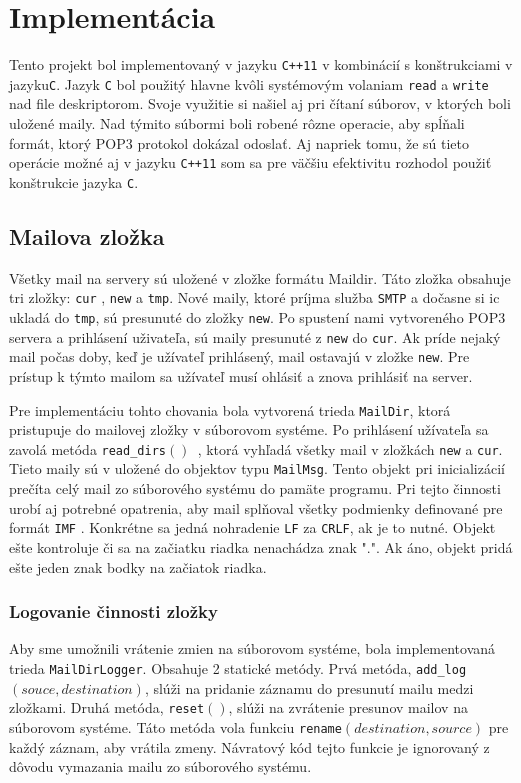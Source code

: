 \documentclass[a4paper, 11pt]{article}
\begin{document}
\section{Implementácia}
Tento projekt bol implementovaný v jazyku {\tt C++11} v kombinácií s konštrukciami v jazyku{\tt C}. Jazyk {\tt C} bol použitý hlavne kvôli systémovým volaniam {\tt read} a {\tt write} nad file deskriptorom. Svoje využitie si našiel aj pri čítaní súborov, v ktorých boli uložené maily. Nad týmito súbormi boli robené rôzne operacie, aby spĺňali formát, ktorý POP3 protokol dokázal odoslať. Aj napriek tomu, že sú tieto operácie možné aj v jazyku {\tt C++11} som sa pre väčšiu efektivitu rozhodol použiť konštrukcie jazyka {\tt C}.

	\subsection{Mailova zložka}
	Všetky mail na servery sú uložené v zložke formátu Maildir. Táto zložka obsahuje tri zložky: {\tt cur} , {\tt new} a {\tt tmp}. Nové maily, ktoré príjma služba {\tt SMTP} a dočasne si ic ukladá do {\tt tmp}, sú presunuté do zložky {\tt new}. Po spustení nami vytvoreného POP3 servera a prihlásení uživateľa, sú maily presunuté z {\tt new} do {\tt cur}. Ak príde nejaký mail počas doby, keď je užívateľ prihlásený, mail ostavajú v zložke {\tt new}. Pre prístup k týmto mailom sa užívateľ musí ohlásiť a znova prihlásiť na server.
	
	Pre implementáciu tohto chovania bola vytvorená trieda {\tt MailDir}, ktorá pristupuje do mailovej zložky v súborovom systéme. Po prihlásení užívateľa sa zavolá metóda {\tt read\_dirs$()$ }, ktorá vyhľadá všetky mail v zložkách {\tt new} a {\tt cur}. Tieto maily sú v uložené do objektov typu {\tt MailMsg}. Tento objekt pri inicializácií prečíta celý mail zo súborového systému do pamäte programu. Pri tejto činnosti urobí aj potrebné opatrenia, aby mail splňoval všetky podmienky definované pre formát {\tt IMF} . Konkrétne sa jedná nohradenie {\tt LF} za {\tt CRLF}, ak je to nutné. Objekt ešte kontroluje či sa na začiatku riadka nenachádza znak ".". Ak áno, objekt pridá ešte jeden znak bodky na začiatok riadka.
	
		\subsubsection{Logovanie činnosti zložky}
		Aby sme umožnili vrátenie zmien na súborovom systéme, bola implementovaná trieda {\tt MailDirLogger}. Obsahuje 2 statické metódy. Prvá metóda, {\tt add\_log$(souce, destination)$}, slúži na pridanie záznamu do presunutí mailu medzi zložkami. Druhá metóda, {\tt reset$()$}, slúži na zvrátenie presunov mailov na súborovom systéme. Táto metóda vola funkciu {\tt rename$(destination, source)$} pre každý záznam, aby vrátila zmeny. Návratový kód tejto funkcie je ignorovaný z dôvodu vymazania mailu zo súborového systému.
	
\end{document}
